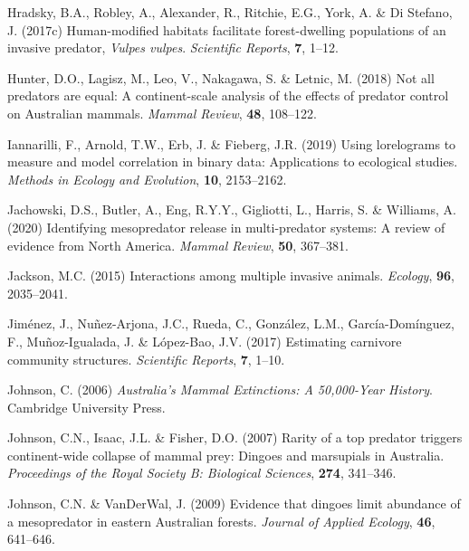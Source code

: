 \documentclass[11pt,a4paper,titlepage,twoside,openright]{style/unimelbthesis}
\begin{document}
\begin{mainmatter}
\leavevmode\hypertarget{ref-hradsky2017human}{}%
Hradsky, B.A., Robley, A., Alexander, R., Ritchie, E.G., York, A. \& Di Stefano, J. (2017c) Human-modified habitats facilitate forest-dwelling populations of an invasive predator, \emph{Vulpes vulpes}. \emph{Scientific Reports}, \textbf{7}, 1--12.

\leavevmode\hypertarget{ref-hunter2018not}{}%
Hunter, D.O., Lagisz, M., Leo, V., Nakagawa, S. \& Letnic, M. (2018) Not all predators are equal: A continent-scale analysis of the effects of predator control on Australian mammals. \emph{Mammal Review}, \textbf{48}, 108--122.

\leavevmode\hypertarget{ref-iannarilli2019lorelograms}{}%
Iannarilli, F., Arnold, T.W., Erb, J. \& Fieberg, J.R. (2019) Using lorelograms to measure and model correlation in binary data: Applications to ecological studies. \emph{Methods in Ecology and Evolution}, \textbf{10}, 2153--2162.

\leavevmode\hypertarget{ref-jachowski2020identifying}{}%
Jachowski, D.S., Butler, A., Eng, R.Y.Y., Gigliotti, L., Harris, S. \& Williams, A. (2020) Identifying mesopredator release in multi-predator systems: A review of evidence from North America. \emph{Mammal Review}, \textbf{50}, 367--381.

\leavevmode\hypertarget{ref-jackson2015interactions}{}%
Jackson, M.C. (2015) Interactions among multiple invasive animals. \emph{Ecology}, \textbf{96}, 2035--2041.

\leavevmode\hypertarget{ref-jimenez2017estimating}{}%
Jiménez, J., Nuñez-Arjona, J.C., Rueda, C., González, L.M., García-Domínguez, F., Muñoz-Igualada, J. \& López-Bao, J.V. (2017) Estimating carnivore community structures. \emph{Scientific Reports}, \textbf{7}, 1--10.

\leavevmode\hypertarget{ref-johnson2006australia}{}%
Johnson, C. (2006) \emph{Australia's Mammal Extinctions: A 50,000-Year History}. Cambridge University Press.

\leavevmode\hypertarget{ref-johnson2007rarity}{}%
Johnson, C.N., Isaac, J.L. \& Fisher, D.O. (2007) Rarity of a top predator triggers continent-wide collapse of mammal prey: Dingoes and marsupials in Australia. \emph{Proceedings of the Royal Society B: Biological Sciences}, \textbf{274}, 341--346.

\leavevmode\hypertarget{ref-johnson2009evidence}{}%
Johnson, C.N. \& VanDerWal, J. (2009) Evidence that dingoes limit abundance of a mesopredator in eastern Australian forests. \emph{Journal of Applied Ecology}, \textbf{46}, 641--646.


\end{mainmatter}
\end{document}
